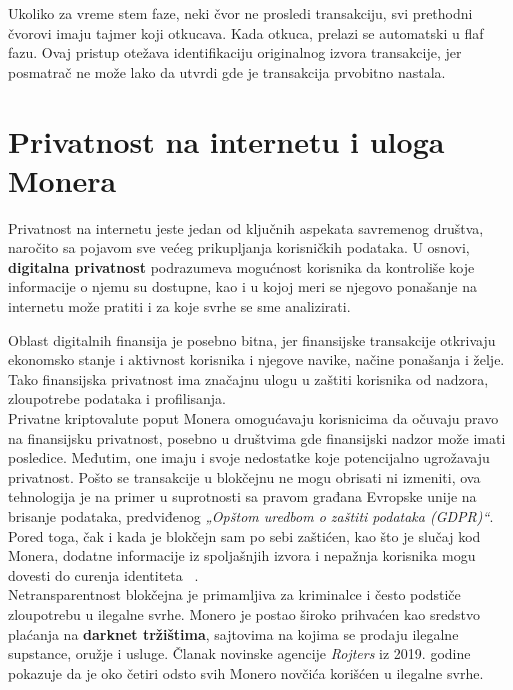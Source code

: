 \documentclass[12pt,a4paper]{article}
\begin{document}
Ukoliko za vreme stem faze, neki čvor ne prosledi transakciju, svi prethodni čvorovi imaju tajmer koji otkucava. Kada otkuca, prelazi se automatski u flaf fazu.
Ovaj pristup otežava identifikaciju originalnog izvora transakcije, jer posmatrač ne može lako da utvrdi gde je transakcija prvobitno nastala.


\newpage
\section{Privatnost na internetu i uloga Monera}
Privatnost na internetu jeste jedan od ključnih aspekata savremenog društva, naročito sa pojavom sve većeg prikupljanja korisničkih podataka. U osnovi, \textbf{digitalna privatnost} podrazumeva mogućnost korisnika da kontroliše koje informacije o njemu su dostupne, kao i u kojoj meri se njegovo ponašanje na internetu može pratiti i za koje svrhe se sme analizirati.

Oblast digitalnih finansija je posebno bitna, jer finansijske transakcije otkrivaju ekonomsko stanje i aktivnost korisnika i njegove navike, načine ponašanja i želje. Tako finansijska privatnost ima značajnu ulogu u zaštiti korisnika od nadzora, zloupotrebe podataka i profilisanja.\\ 

Privatne kriptovalute poput Monera omogućavaju korisnicima da očuvaju pravo na finansijsku privatnost, posebno u društvima gde finansijski nadzor može imati posledice. Međutim, one imaju i svoje nedostatke koje potencijalno ugrožavaju privatnost. Pošto se transakcije u blokčejnu ne mogu obrisati ni izmeniti, ova tehnologija je na primer u suprotnosti sa pravom građana Evropske unije na brisanje podataka, predviđenog \textit{„Opštom uredbom o zaštiti podataka (GDPR)“}. Pored toga, čak i kada je blokčejn sam po sebi zaštićen, kao što je slučaj kod Monera, dodatne informacije iz spoljašnjih izvora i nepažnja korisnika mogu dovesti do curenja identiteta ~\cite{ethicalChallenges}.\\

Netransparentnost blokčejna je primamljiva za kriminalce i često podstiče zloupotrebu u ilegalne svrhe. Monero je postao široko prihvaćen kao sredstvo plaćanja na \textbf{darknet tržištima}, sajtovima na kojima se prodaju ilegalne supstance, oružje i usluge. Članak novinske agencije \textit{Rojters} iz 2019. godine  ~\cite{reutersMonero} pokazuje da je oko četiri odsto svih Monero novčića korišćen u ilegalne svrhe.\\ 
\end{document}
